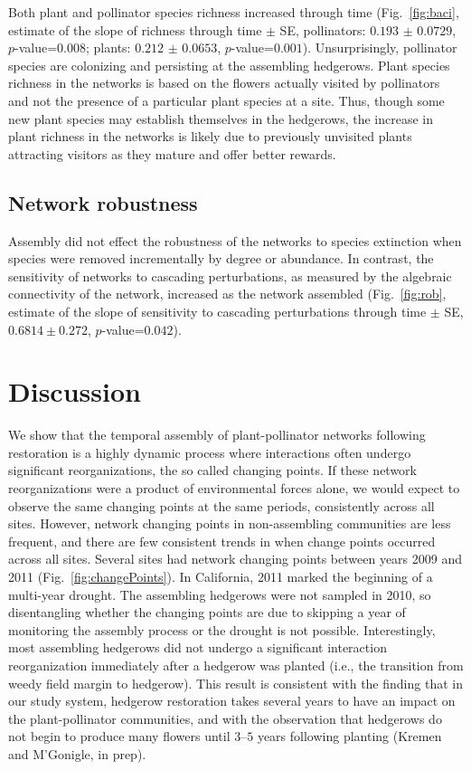 \documentclass[12pt]{article}
\begin{document}
Both plant and pollinator species richness increased through time
(Fig.~\ref{fig:baci}, estimate of the slope of richness through time
$\pm$ SE, pollinators: $0.193$ $\pm$ $0.0729$, $p$-value=$0.008$;
plants: $0.212$ $\pm$ $0.0653$, $p$-value=$0.001$). Unsurprisingly,
pollinator species are colonizing and persisting at the assembling
hedgerows. Plant species richness in the networks is based on the
flowers actually visited by pollinators and not the presence of a
particular plant species at a site. Thus, though some new plant
species may establish themselves in the hedgerows, the increase in
plant richness in the networks is likely due to previously unvisited
plants attracting visitors as they mature and offer better rewards.

\subsection*{Network robustness}
Assembly did not effect the robustness of the networks to species
extinction when species were removed incrementally by
degree %
or abundance. %
In contrast, the sensitivity of networks to
cascading perturbations, as measured by the algebraic connectivity of
the network, increased as the network assembled (Fig.~\ref{fig:rob},
estimate of the slope of sensitivity to cascading perturbations
through time $\pm$ SE, $0.6814 \pm 0.272$, $p$-value=$0.042$).

\section*{Discussion}
\label{sec:discussion}

We show that the temporal assembly of plant-pollinator networks
following restoration is a highly dynamic process where interactions
often undergo significant reorganizations, the so called changing
points. If these network reorganizations were a product of
environmental forces alone, we would expect to observe the same
changing points at the same periods, consistently across all
sites. However, network changing points in non-assembling communities
are less frequent, and there are few consistent trends in when change
points occurred across all sites. Several sites had network changing
points between years 2009 and 2011 (Fig.~\ref{fig:changePoints}). In
California, 2011 marked the beginning of a multi-year drought. The
assembling hedgerows were not sampled in 2010, so disentangling
whether the changing points are due to skipping a year of monitoring
the assembly process or the drought is not possible. Interestingly,
most assembling hedgerows did not undergo a significant interaction
reorganization immediately after a hedgerow was planted (i.e., the
transition from weedy field margin to hedgerow). This result is
consistent with the finding that in our study system, hedgerow
restoration takes several years to have an impact on the
plant-pollinator communities, and with the observation that hedgerows
do not begin to produce many flowers until $3$--$5$ years following
planting (Kremen and M'Gonigle, in prep).
\end{document}
